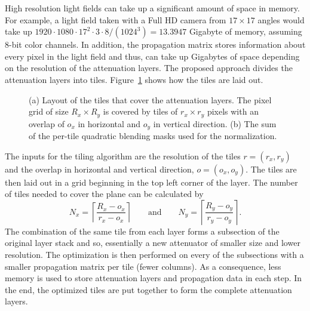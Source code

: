 High resolution light fields can take up a significant amount of space in memory. 
For example, a light field taken with a Full HD camera from $17 \times 17$ angles would take up $1920 \cdot 1080 \cdot 17^2 \cdot 3 \cdot 8 / (1024^3) = 13.3947$ Gigabyte of memory, assuming \mbox{8-bit} color channels. 
In addition, the propagation matrix stores information about every pixel in the light field and thus, can take up Gigabytes of space depending on the resolution of the attenuation layers. 
The proposed approach divides the attenuation layers into tiles. 
Figure~\ref{fig:tiling_layout} shows how the tiles are laid out.
\begin{figure}[tb]
	\begin{subfigure}{0.5\textwidth}
		\centering
		
		\caption{}
		\label{fig:tiling_layout}
	\end{subfigure}%
	\begin{subfigure}{0.5\textwidth}
		\centering
		
		\caption{}
		\label{fig:sum_of_quadratic_blending_masks}
	\end{subfigure}%
	\caption[Tiling layout]
			{(a) Layout of the tiles that cover the attenuation layers.
				 The pixel grid of size $R_x \times R_y$ is covered by tiles of $r_x \times r_y$ pixels with an overlap of $o_x$ in horizontal and $o_y$ in vertical direction.
			 (b) The sum of the per-tile quadratic blending masks used for the normalization.}
\end{figure}
The inputs for the tiling algorithm are the resolution of the tiles $r = (r_x, r_y)$ and the overlap in horizontal and vertical direction, $o = (o_x, o_y)$. 
The tiles are then laid out in a grid beginning in the top left corner of the layer. 
The number of tiles needed to cover the plane can be calculated by 
\begin{equation}
	N_x = \left \lceil \dfrac{R_x - o_x}{r_x - o_x} \right \rceil
	\qquad 
	\text{and} 
	\qquad
	N_y = \left \lceil \dfrac{R_y - o_y}{r_y - o_y} \right \rceil.
\end{equation}
The combination of the same tile from each layer forms a subsection of the original layer stack and so, essentially a new attenuator of smaller size and lower resolution.
The optimization is then performed on every of the subsections with a smaller propagation matrix per tile (fewer columns). 
As a consequence, less memory is used to store attenuation layers and propagation data in each step.
In the end, the optimized tiles are put together to form the complete attenuation layers. 

